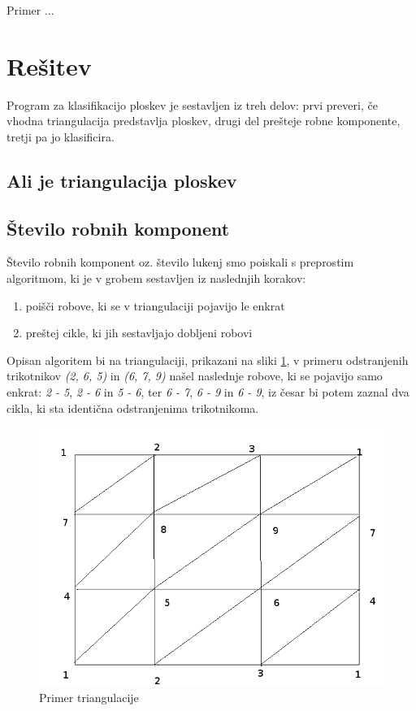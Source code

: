 \documentclass{article}
\begin{document}
Primer ...


\section{Rešitev}
Program za klasifikacijo ploskev je sestavljen iz treh delov: prvi preveri, če vhodna triangulacija predstavlja ploskev, drugi del prešteje robne komponente, tretji pa jo klasificira.
\subsection{Ali je triangulacija ploskev}

\subsection{Število robnih komponent}
Število robnih komponent oz. število lukenj smo poiskali s preprostim algoritmom, ki je v grobem sestavljen iz naslednjih korakov:
\begin{enumerate}
\item poišči robove, ki se v triangulaciji pojavijo le enkrat
\item preštej cikle, ki jih sestavljajo dobljeni robovi
\end{enumerate}
Opisan algoritem bi na triangulaciji, prikazani na sliki \ref{triangulacija}, v primeru odstranjenih trikotnikov \textit{(2, 6, 5)} in \textit{(6, 7, 9)} našel naslednje robove, ki se pojavijo samo enkrat: \textit{2 - 5}, \textit{2 - 6} in \textit{5 - 6}, ter \textit{6 - 7}, \textit{6 - 9} in \textit{6 - 9}, iz česar bi potem zaznal dva cikla, ki sta identična odstranjenima trikotnikoma.

\begin{figure}
\begin{center}
\includegraphics[scale=0.35]{Triangulation.png}
\caption{Primer triangulacije}
\end{center}
\label{triangulacija}
\end{figure}
\end{document}
